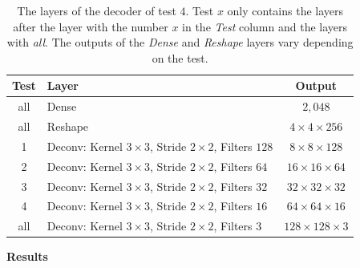 \begin{center}
    \begin{table}[H]
        \centering
        \begin{tabular}{ | c | l | c | }
            \hline
            Test &Layer & Output\\ \hline
            all &Dense                                                            & $2,048$                   \\
            all &Reshape                                                          & $4\times 4\times    256$  \\
            1   &Deconv: Kernel $3\times3$, Stride $2\times2$, Filters $128$      & $8\times 8\times    128$  \\
            2   &Deconv: Kernel $3\times3$, Stride $2\times2$, Filters $64 $      & $16\times 16\times  64 $  \\
            3   &Deconv: Kernel $3\times3$, Stride $2\times2$, Filters $32 $      & $32\times 32\times  32 $  \\
            4   &Deconv: Kernel $3\times3$, Stride $2\times2$, Filters $16 $      & $64\times 64\times  16 $  \\
            all &Deconv: Kernel $3\times3$, Stride $2\times2$, Filters $3  $      & $128\times 128\times3  $  \\
            \hline
        \end{tabular}
        \caption{The layers of the decoder of test $4$. 
        Test $x$ only contains the layers after the layer with the number
        $x$ in the \textit{Test} column and the layers with \textit{all}.
        The outputs of the \textit{Dense} and \textit{Reshape}
        layers vary depending on the test.} 
    \end{table}
\end{center}


\pagebreak
\textbf{Results}


